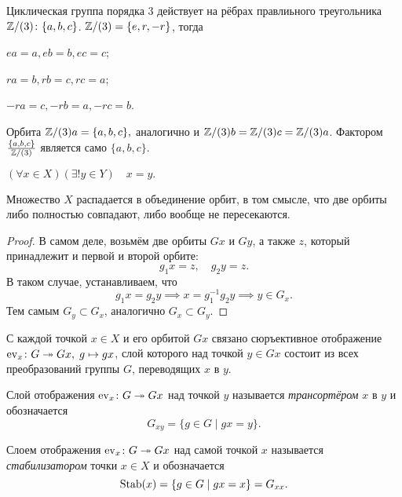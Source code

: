 \begin{example}
    Циклическая группа порядка 3 действует на рёбрах правлиьного треугольника $\mathbb Z/(3)\colon \{a, b, c\}$. $\mathbb Z/(3) = \{e, r, -r\}$, тогда \begin{bullets}
    \item $ea = a, eb = b, ec = c$;
    \item $ra = b, rb = c, rc = a$;
    \item $-ra = c, -rb = a, -rc = b$.
    \end{bullets}

    Орбита $\mathbb Z/(3)a = \{a, b, c\}, $ аналогично и $\mathbb Z/(3)b = \mathbb Z/(3)c = \mathbb Z/(3)a$. Фактором $\frac{\{a, b, c\}}{\mathbb Z/(3)}$ является само $\{a, b, c\}$.

    $(\forall x \in X)(\exists! y \in Y) \quad x = y.$
\end{example}

\begin{proposition}
    Множество $X$ распадается в объединение орбит, в том смысле, что две орбиты либо полностью совпадают, либо вообще не пересекаются. 
\end{proposition}
\begin{proof}
    В самом деле, возьмём две орбиты $Gx$ и $Gy$, а также $z$, который принадлежит и первой и второй орбите: \[g_1x = z, \quad g_2y = z.\]
    В таком случае, устанавливаем, что $$g_1x = g_2y \implies x = g_1^{-1}g_2y \implies y \in G_x.$$
    Тем самым $G_y \subset G_x$, аналогично $G_x \subset G_y$.
\end{proof}

С каждой точкой $x \in X$ и его орбитой $Gx$ связано сюръективное отображение $\operatorname{ev}_x \colon G \twoheadrightarrow Gx,\; g \mapsto gx$, слой которого над точкой $y \in Gx$ состоит из всех преобразований группы $G$, переводящих $x$ в $y$. 
\begin{definition}
    [Транспортёр]
    Слой отображения $\operatorname{ev}_x \colon G \twoheadrightarrow Gx$ над точкой $y$ называется \emph{трансортёром} $x$ в $y$ и обозначается \[G_{xy} = \{g \in G \mid gx = y\}.\]
\end{definition}
\begin{definition}[Стабилизатор]
    Слоем отображения $\operatorname{ev}_x \colon G \twoheadrightarrow Gx$ над самой точкой $x$ называется \emph{стабилизатором} точки $x \in X$ и обозначается \[ \operatorname{Stab}(x) = \{g \in G \mid gx = x \} = G_{xx}.\]
\end{definition}

